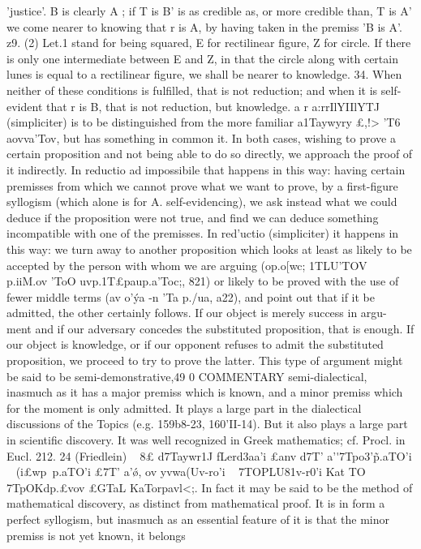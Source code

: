 {{{{{{{{{{{{{{{{{{{{{{{{{'justice'. B is clearly A ; if T is B' is as credible as, or more
credible than, T is A' we come nearer to knowing that r is A,
by having taken in the premiss 'B is A'.
z9. (2) Let.1 stand for being squared, E for rectilinear figure,
Z for circle. If there is only one intermediate between E and Z,
in that the circle along with certain lunes is equal to a rectilinear
figure, we shall be nearer to knowledge.
34. When neither of these conditions is fulfilled, that is not
reduction; and when it is self-evident that r is B, that is not
reduction, but knowledge.
a
r
a:rrIlYIIlYTJ (simpliciter) is to be distinguished from the more
familiar a1Taywyry £,!> 'T6 aovva'Tov, but has something in common
\vith it. In both cases, wishing to prove a certain proposition
and not being able to do so directly, we approach the proof of it
indirectly. In reductio ad impossibile that happens in this way:
having certain premisses from which we cannot prove what we
want to prove, by a first-figure syllogism (which alone is for
A. self-evidencing), we ask instead what we could deduce if the
proposition were not true, and find we can deduce something
incompatible with one of the premisses. In red'uctio (simpliciter)
it happens in this way: we turn away to another proposition
which looks at least as likely to be accepted by the person with
whom we are arguing (op.o[wc; 1TLU'TOV ~ p.iiM.ov 'ToO uvp.1T£paup.a'Toc;,
821) or likely to be proved with the use of fewer middle terms
(av o'\'ya -n 'Ta p./ua, a22), and point out that if it be admitted, the
other certainly follows. If our object is merely success in argu-
ment and if our adversary concedes the substituted proposition,
that is enough. If our object is knowledge, or if our opponent
refuses to admit the substituted proposition, we proceed to try to
prove the latter.
This type of argument might be said to be semi-demonstrative,49 0
COMMENTARY
semi-dialectical, inasmuch as it has a major premiss which is
known, and a minor premiss which for the moment is only
admitted. It plays a large part in the dialectical discussions of
the Topics (e.g. 159b8-23, 160'II-14). But it also plays a large
part in scientific discovery. It was well recognized in Greek
mathematics; cf. Procl. in Eucl. 212. 24 (Friedlein) ~ 8£ d7Taywr1J
fLerd{3aa{'i £anv d7T' a'\'\ou 7Tpo{3'\~p.aTO'i ~ (i£wp~p.aTO'i £7T' a'\'\o, ov
yvwa(Uv-ro'i ~ 7TOPLU81v-r0'i Kat TO 7TpOKdp.£vov £GTaL KaTorpavl<;. In
fact it may be said to be the method of mathematical discovery,
as distinct from mathematical proof.
It is in form a perfect syllogism, but inasmuch as an essential
feature of it is that the minor premiss is not yet known, it belongs
}}}}}}}}}}}}}}}}}}}}}}}}}}}}
